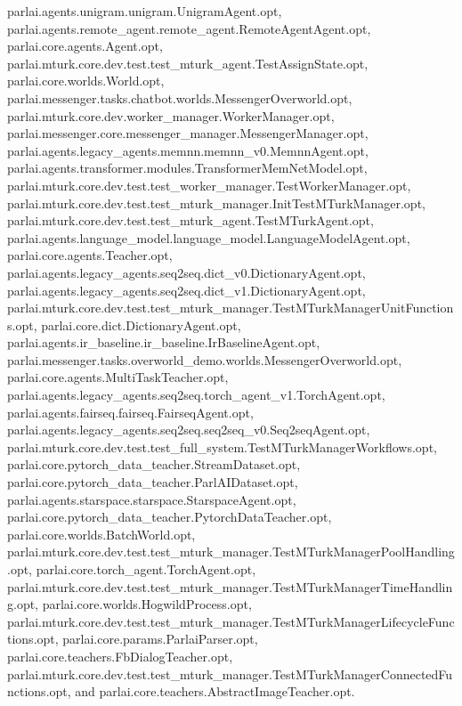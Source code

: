parlai.\+agents.\+unigram.\+unigram.\+Unigram\+Agent.\+opt, parlai.\+agents.\+remote\+\_\+agent.\+remote\+\_\+agent.\+Remote\+Agent\+Agent.\+opt, parlai.\+core.\+agents.\+Agent.\+opt, parlai.\+mturk.\+core.\+dev.\+test.\+test\+\_\+mturk\+\_\+agent.\+Test\+Assign\+State.\+opt, parlai.\+core.\+worlds.\+World.\+opt, parlai.\+messenger.\+tasks.\+chatbot.\+worlds.\+Messenger\+Overworld.\+opt, parlai.\+mturk.\+core.\+dev.\+worker\+\_\+manager.\+Worker\+Manager.\+opt, parlai.\+messenger.\+core.\+messenger\+\_\+manager.\+Messenger\+Manager.\+opt, parlai.\+agents.\+legacy\+\_\+agents.\+memnn.\+memnn\+\_\+v0.\+Memnn\+Agent.\+opt, parlai.\+agents.\+transformer.\+modules.\+Transformer\+Mem\+Net\+Model.\+opt, parlai.\+mturk.\+core.\+dev.\+test.\+test\+\_\+worker\+\_\+manager.\+Test\+Worker\+Manager.\+opt, parlai.\+mturk.\+core.\+dev.\+test.\+test\+\_\+mturk\+\_\+manager.\+Init\+Test\+M\+Turk\+Manager.\+opt, parlai.\+mturk.\+core.\+dev.\+test.\+test\+\_\+mturk\+\_\+agent.\+Test\+M\+Turk\+Agent.\+opt, parlai.\+agents.\+language\+\_\+model.\+language\+\_\+model.\+Language\+Model\+Agent.\+opt, parlai.\+core.\+agents.\+Teacher.\+opt, parlai.\+agents.\+legacy\+\_\+agents.\+seq2seq.\+dict\+\_\+v0.\+Dictionary\+Agent.\+opt, parlai.\+agents.\+legacy\+\_\+agents.\+seq2seq.\+dict\+\_\+v1.\+Dictionary\+Agent.\+opt, parlai.\+mturk.\+core.\+dev.\+test.\+test\+\_\+mturk\+\_\+manager.\+Test\+M\+Turk\+Manager\+Unit\+Functions.\+opt, parlai.\+core.\+dict.\+Dictionary\+Agent.\+opt, parlai.\+agents.\+ir\+\_\+baseline.\+ir\+\_\+baseline.\+Ir\+Baseline\+Agent.\+opt, parlai.\+messenger.\+tasks.\+overworld\+\_\+demo.\+worlds.\+Messenger\+Overworld.\+opt, parlai.\+core.\+agents.\+Multi\+Task\+Teacher.\+opt, parlai.\+agents.\+legacy\+\_\+agents.\+seq2seq.\+torch\+\_\+agent\+\_\+v1.\+Torch\+Agent.\+opt, parlai.\+agents.\+fairseq.\+fairseq.\+Fairseq\+Agent.\+opt, parlai.\+agents.\+legacy\+\_\+agents.\+seq2seq.\+seq2seq\+\_\+v0.\+Seq2seq\+Agent.\+opt, parlai.\+mturk.\+core.\+dev.\+test.\+test\+\_\+full\+\_\+system.\+Test\+M\+Turk\+Manager\+Workflows.\+opt, parlai.\+core.\+pytorch\+\_\+data\+\_\+teacher.\+Stream\+Dataset.\+opt, parlai.\+core.\+pytorch\+\_\+data\+\_\+teacher.\+Parl\+A\+I\+Dataset.\+opt, parlai.\+agents.\+starspace.\+starspace.\+Starspace\+Agent.\+opt, parlai.\+core.\+pytorch\+\_\+data\+\_\+teacher.\+Pytorch\+Data\+Teacher.\+opt, parlai.\+core.\+worlds.\+Batch\+World.\+opt, parlai.\+mturk.\+core.\+dev.\+test.\+test\+\_\+mturk\+\_\+manager.\+Test\+M\+Turk\+Manager\+Pool\+Handling.\+opt, parlai.\+core.\+torch\+\_\+agent.\+Torch\+Agent.\+opt, parlai.\+mturk.\+core.\+dev.\+test.\+test\+\_\+mturk\+\_\+manager.\+Test\+M\+Turk\+Manager\+Time\+Handling.\+opt, parlai.\+core.\+worlds.\+Hogwild\+Process.\+opt, parlai.\+mturk.\+core.\+dev.\+test.\+test\+\_\+mturk\+\_\+manager.\+Test\+M\+Turk\+Manager\+Lifecycle\+Functions.\+opt, parlai.\+core.\+params.\+Parlai\+Parser.\+opt, parlai.\+core.\+teachers.\+Fb\+Dialog\+Teacher.\+opt, parlai.\+mturk.\+core.\+dev.\+test.\+test\+\_\+mturk\+\_\+manager.\+Test\+M\+Turk\+Manager\+Connected\+Functions.\+opt, and parlai.\+core.\+teachers.\+Abstract\+Image\+Teacher.\+opt.


